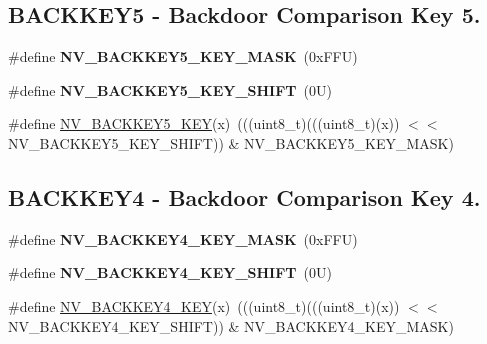 \subsection*{B\+A\+C\+K\+K\+E\+Y5 -\/ Backdoor Comparison Key 5.}
\begin{DoxyCompactItemize}
\item 
\mbox{\label{group___n_v___register___masks_gab1e58bd037f31bcaa1b96a71340315ba}} 
\#define {\bfseries N\+V\+\_\+\+B\+A\+C\+K\+K\+E\+Y5\+\_\+\+K\+E\+Y\+\_\+\+M\+A\+SK}~(0x\+F\+F\+U)
\item 
\mbox{\label{group___n_v___register___masks_ga68762e18611e6dfaed3ddfd7847c09f4}} 
\#define {\bfseries N\+V\+\_\+\+B\+A\+C\+K\+K\+E\+Y5\+\_\+\+K\+E\+Y\+\_\+\+S\+H\+I\+FT}~(0\+U)
\item 
\#define \mbox{\hyperlink{group___n_v___register___masks_ga07bc019ba659fc1b38053c8f191371b6}{N\+V\+\_\+\+B\+A\+C\+K\+K\+E\+Y5\+\_\+\+K\+EY}}(x)~(((uint8\+\_\+t)(((uint8\+\_\+t)(x)) $<$$<$ N\+V\+\_\+\+B\+A\+C\+K\+K\+E\+Y5\+\_\+\+K\+E\+Y\+\_\+\+S\+H\+I\+FT)) \& N\+V\+\_\+\+B\+A\+C\+K\+K\+E\+Y5\+\_\+\+K\+E\+Y\+\_\+\+M\+A\+SK)
\end{DoxyCompactItemize}
\subsection*{B\+A\+C\+K\+K\+E\+Y4 -\/ Backdoor Comparison Key 4.}
\begin{DoxyCompactItemize}
\item 
\mbox{\label{group___n_v___register___masks_ga49a74f76cf8b7787284ac6e510e4e0c3}} 
\#define {\bfseries N\+V\+\_\+\+B\+A\+C\+K\+K\+E\+Y4\+\_\+\+K\+E\+Y\+\_\+\+M\+A\+SK}~(0x\+F\+F\+U)
\item 
\mbox{\label{group___n_v___register___masks_gadfa9b097c522673010b11e94a5a7b9eb}} 
\#define {\bfseries N\+V\+\_\+\+B\+A\+C\+K\+K\+E\+Y4\+\_\+\+K\+E\+Y\+\_\+\+S\+H\+I\+FT}~(0\+U)
\item 
\#define \mbox{\hyperlink{group___n_v___register___masks_gaec4a23e778980f71beab56e3353a0abb}{N\+V\+\_\+\+B\+A\+C\+K\+K\+E\+Y4\+\_\+\+K\+EY}}(x)~(((uint8\+\_\+t)(((uint8\+\_\+t)(x)) $<$$<$ N\+V\+\_\+\+B\+A\+C\+K\+K\+E\+Y4\+\_\+\+K\+E\+Y\+\_\+\+S\+H\+I\+FT)) \& N\+V\+\_\+\+B\+A\+C\+K\+K\+E\+Y4\+\_\+\+K\+E\+Y\+\_\+\+M\+A\+SK)
\end{DoxyCompactItemize}
